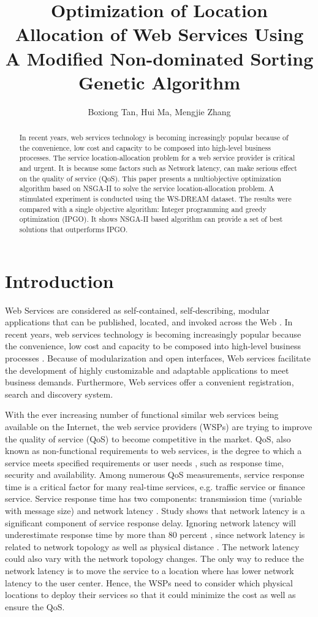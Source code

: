 \documentclass{llncs}
\title{
Optimization of Location Allocation of Web Services Using A Modified Non-dominated Sorting Genetic Algorithm
}
\author{Boxiong Tan, Hui Ma, Mengjie Zhang}
\institute{School of Engineering and Computer Science,
\\Victoria University of Wellington, New Zealand \\
\email{\{Boxiong.Tan, Hui.Ma, Mengjie.Zhang\}@ecs.vuw.ac.nz}}
\begin{document}
\maketitle

\begin{abstract}
In recent years, web services technology is becoming increasingly popular because  of the convenience, 
low cost and capacity to be composed into high-level business processes. 
The service location-allocation problem for a web service provider is critical and urgent. 
It is because some factors such as Network latency, can make serious effect on the quality of service (QoS). 
This paper presents a multiobjective optimization algorithm based on NSGA-II to solve the service location-allocation problem. 
A stimulated experiment is conducted using the WS-DREAM dataset. 
The results were compared with a single objective algorithm: Integer programming and greedy optimization (IPGO). 
It shows NSGA-II based algorithm can provide a set of best solutions that outperforms IPGO.
\end{abstract}

\section{Introduction}
Web Services are considered as self-contained, self-describing, modular applications that can be published, located, and invoked across the Web \cite{Ran}. 
In recent years, web services technology is becoming increasingly popular because the convenience, low cost and capacity to be composed into high-level business processes \cite{Aboolian}.
Because of modularization and open interfaces, Web services facilitate the development of highly 
customizable and adaptable applications to meet business demands. Furthermore, Web services offer a 
convenient registration, search  and discovery system.

With the ever increasing number of functional similar web services being available on the Internet, the web service providers (WSPs) are trying to improve the quality of service (QoS) to become competitive in the market.  
QoS, also known as non-functional requirements to  web services, is the degree to which a service meets specified requirements or user needs \cite{4061431}, such as response time, security and availability. 
Among numerous QoS measurements, service response time is a critical factor for many real-time services, e.g. traffic service or finance service. 
Service response time has two components: transmission time (variable with message size) and network latency \cite{Johansson}. 
Study \cite{916684} shows that network latency is a significant component of service response delay.
Ignoring network latency will underestimate response time by more than 80 percent \cite{Sun}, since network latency is related to network topology as well as physical distance \cite{distanceMetrics}. 
The network latency could also vary with the network topology changes.
The only way to reduce the network latency is to move the service to a location where has lower network latency to the user center. 
Hence, the WSPs need to consider which physical locations to deploy their services so that it could minimize the cost as well as ensure the QoS.
\end{document}
